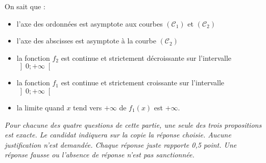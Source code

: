 On sait que :
\begin{itemize}
     \item
     l'axe des ordonnées est asymptote aux courbes $\left(\mathscr C_{1}\right)$ et $\left(\mathscr C_{2}\right)$
     \item
     l'axe des abscisses est asymptote à la courbe $\left(\mathscr C_{2}\right)$
     \item
     la fonction $f_{2}$ est continue et strictement décroissante sur l'intervalle $\left]0; +\infty \right[$
     \item
     la fonction $f_{1}$ est continue et strictement croissante sur l'intervalle $\left]0; +\infty \right[$
     \item
     la limite quand $x$ tend vers $+\infty $ de $f_{1}\left(x\right)$ est $+ \infty $.
\end{itemize}
\textit{Pour chacune des quatre questions de cette partie, une seule des trois propositions est exacte. Le candidat indiquera sur la copie la réponse choisie. Aucune justification n'est demandée. Chaque réponse juste rapporte 0,5 point. Une réponse fausse ou l'absence de réponse n'est pas sanctionnée.}
